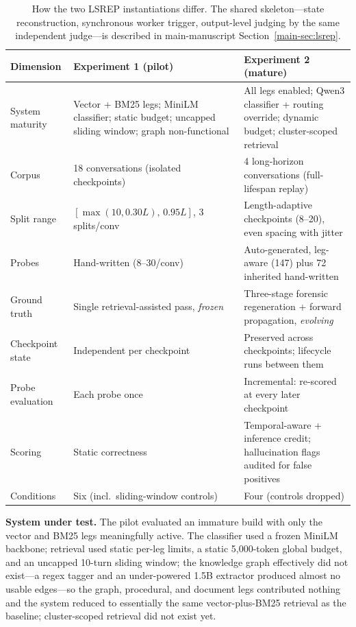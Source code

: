 \documentclass[twoside,11pt]{article}
\begin{document}
\begin{table}[tbp]
\centering
\small


\begin{tabular}{@{}L{2.8cm}L{4.6cm}L{4.6cm}@{}}
\toprule
\textbf{Dimension} & \textbf{Experiment 1 (pilot)} & \textbf{Experiment 2 (mature)} \\
\midrule
System maturity & Vector + BM25 legs; MiniLM classifier; static budget; uncapped sliding window; graph non-functional & All legs enabled; Qwen3 classifier + routing override; dynamic budget; cluster-scoped retrieval \\
Corpus & 18 conversations (isolated checkpoints) & 4 long-horizon conversations (full-lifespan replay) \\
Split range & $[\max(10,0.30L),\,0.95L]$, 3 splits/conv & Length-adaptive checkpoints (8--20), even spacing with jitter \\
Probes & Hand-written (8--30/conv) & Auto-generated, leg-aware (147) plus 72 inherited hand-written \\
Ground truth & Single retrieval-assisted pass, \emph{frozen} & Three-stage forensic regeneration + forward propagation, \emph{evolving} \\
Checkpoint state & Independent per checkpoint & Preserved across checkpoints; lifecycle runs between them \\
Probe evaluation & Each probe once & Incremental: re-scored at every later checkpoint \\
Scoring & Static correctness & Temporal-aware + inference credit; hallucination flags audited for false positives \\
Conditions & Six (incl.\ sliding-window controls) & Four (controls dropped) \\
\bottomrule
\end{tabular}
\caption{How the two LSREP instantiations differ. The shared skeleton---state reconstruction, synchronous worker trigger, output-level judging by the same independent judge---is described in main-manuscript Section~\ref{main-sec:lsrep}.}
\label{tab:exp-diff}
\end{table}

\textbf{System under test.} The pilot evaluated an immature build with only the vector and BM25 legs meaningfully active. The classifier used a frozen MiniLM backbone; retrieval used static per-leg limits, a static 5{,}000-token global budget, and an uncapped 10-turn sliding window; the knowledge graph effectively did not exist---a regex tagger and an under-powered 1.5B extractor produced almost no usable edges---so the graph, procedural, and document legs contributed nothing and the system reduced to essentially the same vector-plus-BM25 retrieval as the baseline; cluster-scoped retrieval did not exist yet.
\end{document}
